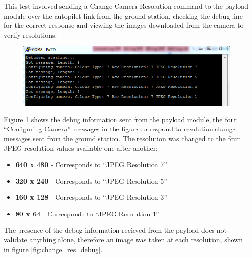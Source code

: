 This test involved sending a Change Camera Resolution command to the payload module over the autopilot link from the ground station, checking the debug line for the correct response and viewing the images downloaded from the camera to verify resolutions.

\begin{figure}[H]
        \centering
        \includegraphics[width=1.00\textwidth]{testing_screenshots/change_res_debug_1.png}
        \label{fig:test_change_res_debug_1}
\end{figure}

Figure \ref{fig:test_change_res_debug_1} shows the debug information sent from the payload module, the four ``Configuring Camera'' messages in the figure correspond to resolution change messages sent from the ground station. The resolution was changed to the four JPEG resolution values available one after another: 
\begin{itemize}
	\item \textbf{640 x 480}  - Corresponds to ``JPEG Resolution 7''
	\item \textbf{320 x 240} - Corresponds to ``JPEG Resolution 5''
	\item \textbf{160 x 128} - Corresponds to ``JPEG Resolution 3''
	\item \textbf{80 x 64} - Corresponds to ``JPEG Resolution 1''
\end{itemize}

The presence of the debug information recieved from the payload does not validate anything alone, therefore an image was taken at each resolution, shown in figure \ref{fig:change_res_debug}.

